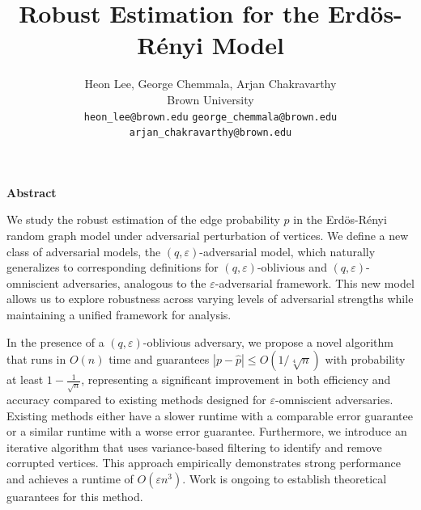 \documentclass[10pt,onecolumn,letterpaper]{article}
\renewenvironment{abstract}
{\begin{center}\begin{minipage}{0.7\textwidth} %
\small\textbf{Abstract}\par\medskip\noindent}
{\end{minipage}\end{center}}
\newcommand{\eps}{\varepsilon}
\let\epsilon\varepsilon
\newcommand{\erdos}{Erdös-Rényi }
\begin{document}
\title{Robust Estimation for the \erdos Model}

\author{Heon Lee, George Chemmala, Arjan Chakravarthy\\
Brown University\\
{\tt\small heon\_lee@brown.edu}
{\tt\small george\_chemmala@brown.edu}
{\tt\small arjan\_chakravarthy@brown.edu}
}


\maketitle


\begin{abstract}
We study the robust estimation of the edge probability $p$ in the \erdos random graph model under adversarial perturbation of vertices. We define a new class of adversarial models, the $(q,\eps)$-adversarial model, which naturally generalizes to corresponding definitions for $(q,\eps)$-oblivious and $(q,\eps)$-omniscient adversaries, analogous to the $\eps$-adversarial framework. This new model allows us to explore robustness across varying levels of adversarial strengths while maintaining a unified framework for analysis.

In the presence of a $(q,\epsilon)$-oblivious adversary, we propose a novel algorithm that runs in $O(n)$ time and guarantees $|p - \hat p| \leq O(1/\sqrt[4]{n})$ with probability at least $1-\frac{1}{\sqrt{n}}$, representing a significant improvement in both efficiency and accuracy compared to existing methods designed for $\eps$-omniscient adversaries. Existing methods either have a slower runtime with a comparable error guarantee or a similar runtime with a worse error guarantee. Furthermore, we introduce an iterative algorithm that uses variance-based filtering to identify and remove corrupted vertices. This approach empirically demonstrates strong performance and achieves a runtime of $O(\eps n^3)$. Work is ongoing to establish theoretical guarantees for this method.
\end{abstract}

\end{document}
